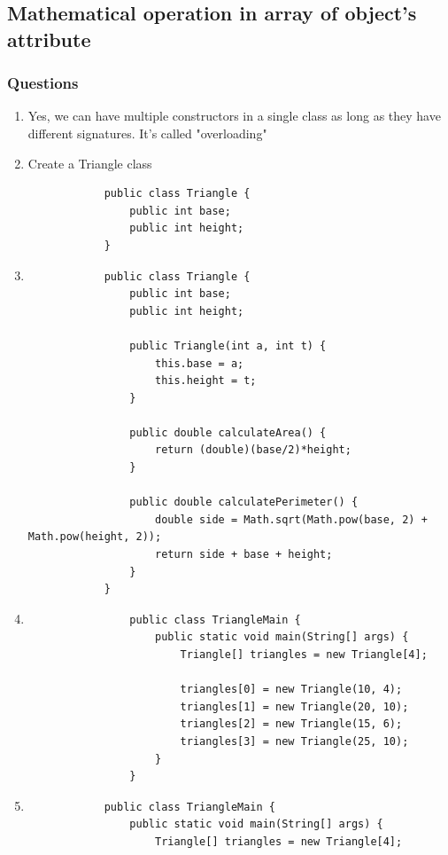 \documentclass[12pt,titlepage]{article}
\begin{document}
\subsection{Mathematical operation in array of object's attribute}
\subsubsection{Questions}
\begin{enumerate}
    \item {
        Yes, we can have multiple constructors in a single class as long as they have different signatures.
        It's called "overloading"
    }
    \newpage
    \item {
        Create a Triangle class

        \begin{verbatim}
            public class Triangle {
                public int base;
                public int height;
            }
        \end{verbatim}
    }
    \item {
        \begin{verbatim}
            public class Triangle {
                public int base;
                public int height;

                public Triangle(int a, int t) {
                    this.base = a;
                    this.height = t;
                }

                public double calculateArea() {
                    return (double)(base/2)*height;
                }

                public double calculatePerimeter() {
                    double side = Math.sqrt(Math.pow(base, 2) + Math.pow(height, 2));
                    return side + base + height;
                }
            }
        \end{verbatim}
    }
    \item {
        \begin{verbatim}
                public class TriangleMain {
                    public static void main(String[] args) {
                        Triangle[] triangles = new Triangle[4];

                        triangles[0] = new Triangle(10, 4);
                        triangles[1] = new Triangle(20, 10);
                        triangles[2] = new Triangle(15, 6);
                        triangles[3] = new Triangle(25, 10);
                    }
                }
        \end{verbatim}
    }
    \newpage
    \item {
        \begin{verbatim}
            public class TriangleMain {
                public static void main(String[] args) {
                    Triangle[] triangles = new Triangle[4];


\end{verbatim}}
\end{enumerate}
\end{document}
